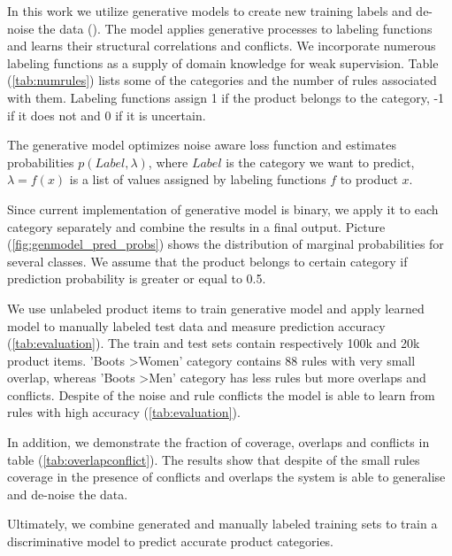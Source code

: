 
In this work we utilize generative models to create new training labels and de-noise the data (\cite{genmodels}).
The model applies generative processes to labeling functions and learns their structural correlations and conflicts.
We incorporate numerous labeling functions as a supply of domain knowledge for weak supervision. Table (\ref{tab:numrules})
lists some of the categories and the number of rules associated with them. Labeling functions assign 1 if the product belongs
to the category, -1 if it does not and 0 if it is uncertain\cite{genmodels}.

The generative model optimizes noise aware loss function and estimates probabilities $p(Label, \lambda)$,
where $Label$ is the category we want to predict, $\lambda = f(x)$ is a list of values assigned by labeling
functions $f$ to product $x$.

Since current implementation of generative model is binary, we apply it to each
category separately and combine the results in a final output. Picture (\ref{fig:genmodel_pred_probs}) shows
the distribution of marginal probabilities for several classes. We assume that the product belongs to certain category if
prediction probability is greater or equal to 0.5.

We use unlabeled product items to train generative model and apply learned model to manually labeled test data and measure
prediction accuracy (\ref{tab:evaluation}).
The train and test sets contain respectively 100k and 20k product items.
'Boots \textgreater Women' category contains 88 rules with very small overlap, whereas 'Boots \textgreater Men' category
has less rules but more overlaps and conflicts. Despite of the noise and rule conflicts the model is able to learn from rules with high accuracy (\ref{tab:evaluation}).

In addition, we demonstrate the fraction of coverage, overlaps and conflicts in table (\ref{tab:overlapconflict}). The results show that despite
of the small rules coverage in the presence of conflicts and overlaps the system is able to generalise and de-noise the data.

Ultimately, we combine generated and manually labeled training sets to train a discriminative model to predict accurate product categories.

